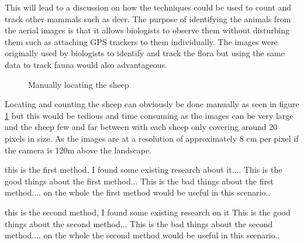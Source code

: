     
This will lead to a discussion on how the techniques could be used to count and track other mammals such as deer. The purpose of identifying the animals from the aerial images is that it allows biologists to observe them without disturbing them such as attaching GPS trackers to them individually. The images were originally used by biologists to identify and track the flora but using the same data to track fauna would also advantageous.

\begin{figure}[H]
    \centering
    \caption{Manually locating the sheep}
    \label{fig:manual}
\end{figure}

Locating and counting the sheep can obviously be done manually as seen in figure \ref{fig:manual} but this would be tedious and time consuming as the images can be very large and the sheep few and far between with each sheep only covering around 20 pixels in size. As the images are at a resolution of approximately 8 cm per pixel if the camera is  120m above the landscape.\cite{rededge}

this is the first method, I found some existing research about it....
This is the good things about the first method...
This is the bad things about the first method....
on the whole the first method would be useful in this scenario..

this is the second method, I found some existing research on it
This is the good things about the second method...
This is the bad things about the second method....
on the whole the second method would be useful in this scenario..

